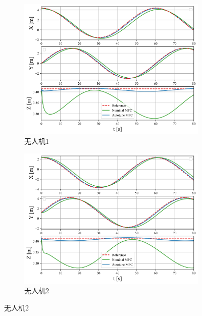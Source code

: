 \documentclass[lang=chs, degree=master, blindreview=true, winfonts=true]{yanputhesis}
\begin{document}
\begin{figure}[hbt!]
    \centering
    \begin{subfigure}[b]{0.45\textwidth}
        \centering
        \includegraphics[width=\textwidth]{picture/kk2/quadrotor0.png}
        \caption{无人机1}
        \label{quadrotor0}
    \end{subfigure}
    \hfill
    \begin{subfigure}[b]{0.45\textwidth}
        \centering
        \includegraphics[width=\textwidth]{picture/kk2/quadrotor1.png}
        \caption{无人机2}
        \label{quadrotor1}
    \end{subfigure}
    
    \vspace{0.5cm} %
    

\end{figure}
\end{document}
